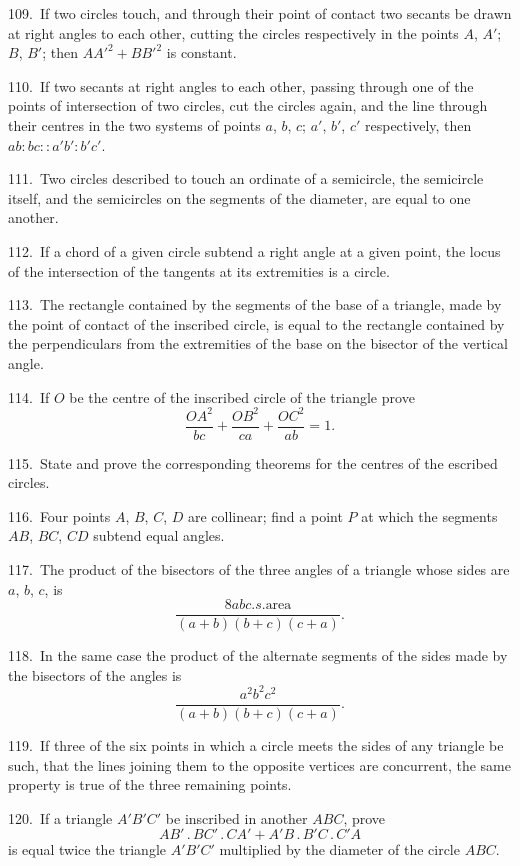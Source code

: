\documentclass[oneside]{book}
\begin{document}
\begin{footnotesize}
109.~If two circles touch, and through their point of contact
two secants be drawn at right angles to each other, cutting the
circles respectively in the points $A$, $A'$; $B$, $B'$; then $AA'^2 + BB'^2$
is constant.

110.~If two secants at right angles to each other, passing through
one of the points of intersection of two circles, cut the circles
again, and the line through their centres in the two systems of
points $a$, $b$, $c$; $a'$, $b'$, $c'$ respectively, then $ab : bc : : a'b' : b'c'$.

111.~Two circles described to touch an ordinate of a semicircle,
the semicircle itself, and the semicircles on the segments
of the diameter, are equal to one another.

112.~If a chord of a given circle subtend a right angle at
a given point, the locus of the intersection of the tangents at
its extremities is a circle.

113.~The rectangle contained by the segments of the base of a
triangle, made by the point of contact of the inscribed circle, is
equal to the rectangle contained by the perpendiculars from the
extremities of the base on the bisector of the vertical angle.



114.~If $O$ be the centre of the inscribed circle of the triangle
prove
\[
\frac{OA^{2}}{bc} + \frac{OB^{2}}{ca} + \frac{OC^{2}}{ab} = 1.
\]

115.~State and prove the corresponding theorems for the
centres of the escribed circles.

116.~Four points $A$, $B$, $C$, $D$ are collinear; find a point $P$ at
which the segments $AB$, $BC$, $CD$ subtend equal angles.

117.~The product of the bisectors of the three angles of a triangle
whose sides are $a$, $b$, $c$, is
\[
  \frac{8 abc.s.\text{area} }
       {  (a+b)(b+c)(c+a)   }.
\]

118.~In the same case the product of the alternate segments of
the sides made by the bisectors of the angles is
\[
  \frac{ a^2 b^2 c^2 }
       {  (a+b)(b+c)(c+a)              }.
\]

119.~If three of the six points in which a circle meets the sides
of any triangle be such, that the lines joining them to the opposite
vertices are concurrent, the same property is true of the three
remaining points.

120.~If a triangle $A'B'C'$ be inscribed in another $ABC$, prove
\[
AB'\,.\,BC'\,.\,CA' + A'B\,.\,B'C\,.\,C'A
\]
is equal twice the triangle $A'B'C'$ multiplied by the diameter of
the circle $ABC$.


\end{footnotesize}
\end{document}
